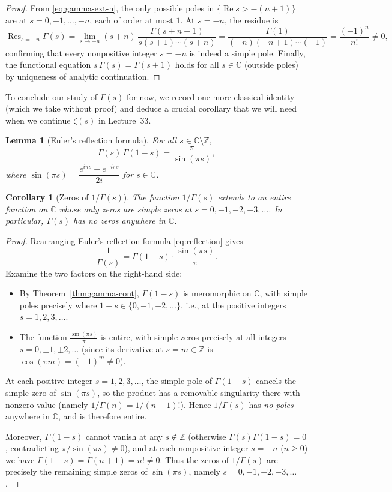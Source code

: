 \documentclass[11pt]{article}
\theoremstyle{plain}
\newtheorem{lemma}[theorem]{Lemma}
\newtheorem{corollary}[theorem]{Corollary}
\theoremstyle{definition}
\theoremstyle{boldremark}
\theoremstyle{remark}
\numberwithin{equation}{section}
\newcommand{\C}{\mathbb{C}}
\newcommand{\Z}{\mathbb{Z}}
\DeclareMathOperator{\Real}{Re}
\begin{document}
\begin{proof}
From \eqref{eq:gamma-ext-n}, the only possible poles in
$\{\Real s > -(n+1)\}$ are at $s=0,-1,\dots,-n$, each of order at most $1$.
At $s=-n$, the residue is
\[
 \operatorname{Res}_{s=-n}\Gamma(s)
 = \lim_{s\to -n} (s+n)\,\frac{\Gamma(s+n+1)}{s(s+1)\cdots(s+n)}
 = \frac{\Gamma(1)}{(-n)(-n+1)\cdots(-1)}
 = \frac{(-1)^n}{n!} \neq 0,
\]
confirming that every nonpositive integer $s=-n$ is indeed a simple pole.
Finally, the functional equation $s\,\Gamma(s)=\Gamma(s+1)$ holds for all
$s\in\C$ (outside poles) by uniqueness of analytic continuation.
\end{proof}

To conclude our study of $\Gamma(s)$ for now, we record one more classical
identity (which we take without proof) and deduce a crucial corollary that
we will need when we continue $\zeta(s)$ in Lecture~33.

\begin{lemma}[Euler's reflection formula]\label{lem:reflection}
For all $s\in\C\setminus\Z$,
\begin{equation}\label{eq:reflection}
 \boxed{\displaystyle
  \Gamma(s)\,\Gamma(1-s) = \frac{\pi}{\sin(\pi s)},}
\end{equation}
where $\sin(\pi s) = \dfrac{e^{i\pi s}-e^{-i\pi s}}{2i}$ for $s\in\C$.
\end{lemma}

\begin{corollary}[Zeros of $1/\Gamma(s)$]\label{cor:inv-gamma}
The function $1/\Gamma(s)$ extends to an \emph{entire} function on $\C$
whose only zeros are simple zeros at $s=0,-1,-2,-3,\dots$. In particular,
$\Gamma(s)$ has no zeros anywhere in $\C$.
\end{corollary}

\begin{proof}
Rearranging Euler's reflection formula \eqref{eq:reflection} gives
\[
 \frac{1}{\Gamma(s)} = \Gamma(1-s)\cdot\frac{\sin(\pi s)}{\pi}.
\]
Examine the two factors on the right-hand side:
\begin{itemize}
 \item By Theorem~\ref{thm:gamma-cont}, $\Gamma(1-s)$ is meromorphic on
       $\C$, with simple poles precisely where $1-s\in\{0,-1,-2,\dots\}$,
       i.e., at the positive integers $s=1,2,3,\dots$.
 \item The function $\frac{\sin(\pi s)}{\pi}$ is entire, with simple zeros
       precisely at all integers $s=0,\pm 1,\pm 2,\dots$ (since its
       derivative at $s=m\in\Z$ is $\cos(\pi m)=(-1)^m\neq 0$).
\end{itemize}
At each positive integer $s=1,2,3,\dots$, the simple pole of $\Gamma(1-s)$
cancels the simple zero of $\sin(\pi s)$, so the product has a removable
singularity there with nonzero value (namely $1/\Gamma(n)=1/(n-1)!$). Hence
$1/\Gamma(s)$ has \emph{no poles} anywhere in $\C$, and is therefore entire.

Moreover, $\Gamma(1-s)$ cannot vanish at any $s\notin\Z$ (otherwise
$\Gamma(s)\Gamma(1-s)=0$, contradicting $\pi/\sin(\pi s)\neq 0$), and at
each nonpositive integer $s=-n$ ($n\geq 0$) we have
$\Gamma(1-s)=\Gamma(n+1)=n!\neq 0$. Thus the zeros of $1/\Gamma(s)$ are
precisely the remaining simple zeros of $\sin(\pi s)$, namely
$s=0,-1,-2,-3,\dots$.
\end{proof}
\end{document}
